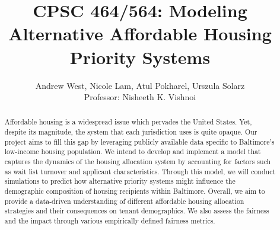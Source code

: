 \documentclass[11pt]{article}
\title{\bf CPSC 464/564: Modeling Alternative Affordable Housing Priority Systems}
\author{Andrew West, Nicole Lam, Atul Pokharel, Urszula Solarz \\
Professor: Nisheeth K. Vishnoi
}
\begin{document}
\maketitle
 
\begin{abstract}
Affordable housing is a widespread issue which pervades the United States. Yet, despite its magnitude, the system that each jurisdiction uses is quite opaque. Our project aims to fill this gap by leveraging publicly available data specific to Baltimore's low-income housing population. We intend to develop and implement a model that captures the dynamics of the housing allocation system by accounting for factors such as wait list turnover and applicant characteristics. Through this model, we will conduct simulations to predict how alternative priority systems might influence the demographic composition of housing recipients within Baltimore. Overall, we aim to provide a data-driven understanding of different affordable housing allocation strategies and their consequences on tenant demographics. We also assess the fairness and the impact through various empirically defined fairness metrics. 
\end{abstract}


\newpage



\tableofcontents

\newpage
\end{document}
